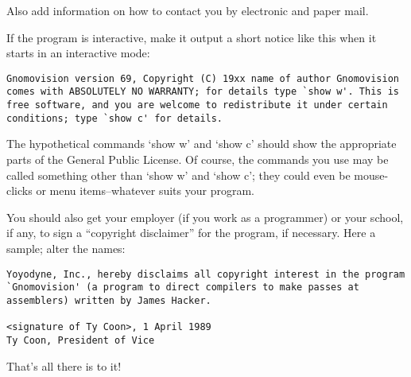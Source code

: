 \documentclass[]{article}
\begin{document}
Also add information on how to contact you by electronic and paper mail.

If the program is interactive, make it output a short notice like this
when it starts in an interactive mode:

\begin{verbatim}
Gnomovision version 69, Copyright (C) 19xx name of author Gnomovision
comes with ABSOLUTELY NO WARRANTY; for details type `show w'. This is
free software, and you are welcome to redistribute it under certain
conditions; type `show c' for details.
\end{verbatim}

The hypothetical commands `show w' and `show c' should show the
appropriate parts of the General Public License. Of course, the commands
you use may be called something other than `show w' and `show c'; they
could even be mouse-clicks or menu items--whatever suits your program.

You should also get your employer (if you work as a programmer) or your
school, if any, to sign a ``copyright disclaimer'' for the program, if
necessary. Here a sample; alter the names:

\begin{verbatim}
Yoyodyne, Inc., hereby disclaims all copyright interest in the program
`Gnomovision' (a program to direct compilers to make passes at
assemblers) written by James Hacker.

<signature of Ty Coon>, 1 April 1989
Ty Coon, President of Vice
\end{verbatim}

That's all there is to it!
\end{document}
